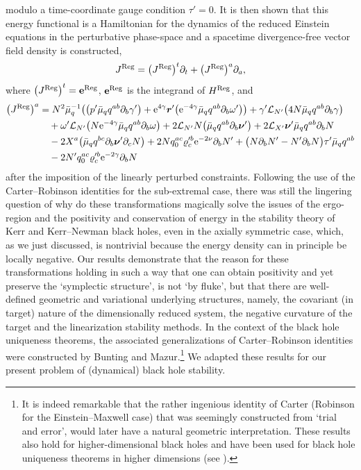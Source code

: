 \documentclass[pdftex]{sigma}
\def\ptl{\partial}%
\def\mbo#1{\boldsymbol{#1}}%
\numberwithin{equation}{section}
\begin{document}
modulo a time-coordinate gauge condition $\tau'=0$.
It is then shown that this energy functional is a Hamiltonian for the dynamics of the reduced Einstein equations in the perturbative phase-space and a spacetime divergence-free vector field density is constructed,
\[
J^{{\rm Reg}} = \bigl(J^{{\rm Reg}}\bigr)^t \ptl_t + \bigl(J^{{\rm Reg}}\bigr)^a \ptl_a,
\]
where $\bigl(J^{{\rm Reg}}\bigr)^t = \mathbf{e}^{{\rm Reg}}$, $\mathbf{e}^{{\rm Reg}}$ is the integrand of $H^{{\rm Reg}}$, and
\begin{align*}
\bigl(J^{{\rm Reg}}\bigr)^a &{}= N^2 \bar{\mu}^{-1}_q \bigl(\bigl(p' \bar{\mu}_q q^{ab} \ptl_b \gamma'\bigr) + {\rm e}^{4\gamma} \mbo{r}' \bigl({\rm e}^{-4\gamma} \bar{\mu}_q q^{ab} \ptl_b \omega'\bigr) \bigr) + \gamma' \mathcal{L}_{N'} \bigl(4N \bar{\mu}_q q^{ab} \ptl_b \gamma\bigr) \notag\\
&\quad{}+ \omega' \mathcal{L}_{N'} \bigl(N {\rm e}^{-4\gamma} \bar{\mu}_q q^{ab} \ptl_b \omega\bigr) + 2 \mathcal{L}_{N'} N \bigl(\bar{\mu}_q q^{ab} \ptl_b \mbo{\nu}'\bigr) + 2 \mathcal{L}_{X'} \mbo{\nu}' \bar{\mu}_q q^{ab} \ptl_b N \notag\\
&\quad{}- 2 X^a \bigl(\bar{\mu}_q q^{bc} \ptl_b \mbo{\nu}' \ptl_c N\bigr) + 2 N q_0^{ac} \varrho'^{b}_c {\rm e}^{-2\nu} \ptl_b N' + \bigl(N \ptl_b N' - N' \ptl_ b N\bigr) \tau' \bar{\mu}_q q^{ab} \notag\\
&\quad{} -2N' q_0^{ac} \varrho'^{b}_c {\rm e}^{-2\gamma} \ptl_b N
\end{align*}
after the imposition of the linearly perturbed constraints.
 Following the use of the Carter--Robinson identities for the sub-extremal case, there was still the lingering question of why do these transformations magically solve the issues of the ergo-region and the positivity and conservation of energy in the stability theory of Kerr and Kerr--Newman black holes, even in the axially symmetric case, which, as we just discussed, is nontrivial because the energy density can in principle be locally negative. Our results demonstrate that the reason for these transformations holding in such a way that one can obtain positivity and yet preserve the `symplectic structure', is not `by fluke', but that there are well-defined geometric and variational underlying structures, namely, the covariant (in target) nature of the dimensionally reduced system, the negative curvature of the target and the linearization stability methods. In the context of the black hole uniqueness theorems, the associated generalizations of Carter--Robinson identities were constructed by Bunting and Mazur.\footnote{It is indeed remarkable that the rather ingenious identity of Carter (Robinson for the Einstein--Maxwell case) that was seemingly constructed from `trial and error', would later have a natural geometric interpretation. These results also hold for higher-dimensional black holes and have been used for black hole uniqueness theorems in higher dimensions (see \cite{Hollands-Ishibashi_12}).} We adapted these results for our present problem of (dynamical) black hole stability.
\end{document}
